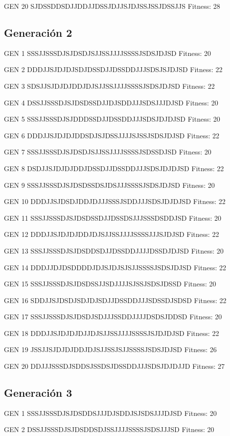 \documentclass[a4paper,12pt]{article}
\begin{document}
GEN 20 SJDSSDDSDJJDDJJDSSJDJJSJDJSSJSSJDSSJJS Fitness: 28

\subsection*{Generación 2}
GEN 1 SSSJJSSSDJSJDSDJSJJSSJJJJSSSSJSDSJDJSD Fitness: 20

GEN 2 DDDJJSJDJDJSDJDSSDJJDSSDDJJJSDSJSJDJSD Fitness: 22

GEN 3 SDSJJSJDJDJDDJDJSJJSSJJJJSSSSJSDSJDJSD Fitness: 22

GEN 4 DSSJJSSSDJSJDSDSSDJJDJSDDJJJSDSJJJDJSD Fitness: 20

GEN 5 SSSJJSSSDJSJDDDSSDJJDSSDDJJJSDSJDJDJSD Fitness: 20

GEN 6 DDDJJSJDJDJDDSDJSJDSSJJJJSJSSJSDSJDJSD Fitness: 22

GEN 7 SSSJJSSSDJSJDSDJSJJSSJJJJSSSSJSDSSDJSD Fitness: 20

GEN 8 DSDJJSJDJDJDDJDSSDJJDSSDDJJJSDSJDJDJSD Fitness: 22

GEN 9 SSSJJSSSDJSJDSDSSDSJDSJJJSSSSJSDSJDJSD Fitness: 20

GEN 10 DDDJJSJDSDJDDJDJJJSSSJSDDJJJSDSJDJDJSD Fitness: 22

GEN 11 SSSJJSSSDJSJDSDSSDJJDSSDSJJJSSSDSDDJSD Fitness: 20

GEN 12 DDDJJSJDJDJDDJDJSJJSSJJJJSSSSJJJSJDJSD Fitness: 22

GEN 13 SSSJJSSSDJSJDSDDSDJJDSSDDJJJJDSSDJDJSD Fitness: 20

GEN 14 DDDJJDJDSDDDDJDJSJDJSJSJJSSSSJSDSJDJSD Fitness: 22

GEN 15 SSSJJSSSDJSJDSDSSJJSDJJJJSJSSJSDSJDSSD Fitness: 20

GEN 16 SDDJJSJDSDJSDJDJSDJJDSSDDJJJSDSSDJSDSD Fitness: 22

GEN 17 SSSJJSSSDJSJDSDJSDJJJSSDDJJJJDSDSJDDSD Fitness: 20

GEN 18 DDDJJSJDJDJDJJDJSJJSSJJJJSSSSJSJDJDJSD Fitness: 22

GEN 19 JSSJJSJDJDJDDJDJSJJSSJSJJSSSSJSDSJDJSD Fitness: 26

GEN 20 DDJJJSSSDJSDDSJSSDSJDSSDDJJJSDSJDJDJJD Fitness: 27

\subsection*{Generación 3}
GEN 1 SSSJJSSSDJSJDSDDSJJJDJSDDJSJSDSJJJDJSD Fitness: 20

GEN 2 DSSJJSSSDJSJDSDDSDJSSJJJJSSSSJSDSJJJSD Fitness: 20
\end{document}
